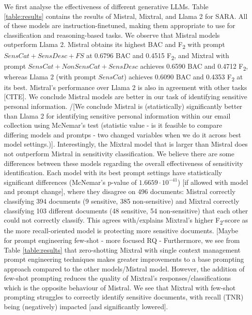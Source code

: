 We first analyse the effectiveness of different generative LLMs. Table \ref{table:results} contains the results of Mistral, Mixtral, and Llama 2 for SARA. All of these models are instruction-finetuned, making them appropriate to use for classification and reasoning-based tasks. We observe that Mistral models outperform Llama 2. Mistral obtains its highest BAC and F\textsubscript{2} with prompt $SensCat+SensDesc+FS$ at 0.6796 BAC and 0.4515 F\textsubscript{2}, and Mixtral with prompt $SensCat+NonSensCat+SensDesc$ achieves 0.6590 BAC and 0.4712 F\textsubscript{2}, whereas Llama 2 (with prompt $SensCat$) achieves 0.6090 BAC and 0.4353 F\textsubscript{2} at its best. Mistral's performance over Llama 2 is also in agreement with other tasks [CITE]. We conclude Mistral models are better in our task of identifying sensitive personal information. /[We conclude Mistral is (statistically) significantly better than Llama 2 for identifying sensitive personal information within our email collection using McNemar’s test (statistic value - is it feasible to compare differing models and promtps - two changed variables when we do it across best model settings.)]. Interestingly, the Mixtral model that is larger than Mistral does not outperform Mistral in sensitivity classification. We believe there are some differences between these models regarding the overall effectiveness of sensitivity identification. Each model with its best prompt settings have statistically significant differences (McNemar's p-value of $1.6659\cdot{10^{-41}}$) [if allowed with model and prompt change], where they disagree on 496 documents: Mistral correctly classifying 394 documents (9 sensitive, 385 non-sensitive) and Mixtral correctly classifying 103 different documents (48 sensitive, 54 non-sensitive) that each other could not correctly classify. This agrees with/explains Mixtral's higher F\textsubscript{2}-score as the more recall-oriented model is protecting more sensitive documents. [Maybe for prompt engineering few-shot - more focused RQ - Furthermore, we see from Table \ref{table:results} that zero-shotting Mixtral 
with single context management prompt engineering techniques makes greater improvements to a base prompting approach compared to the other models/Mistral model. However, the addition of few-shot prompting reduces the quality of Mixtral's responses/classifications which is the opposite behaviour of Mistral. We see that Mixtral with few-shot prompting struggles to correctly identify sensitive documents, with recall (TNR) being (negatively) impacted [and significantly lowered].

